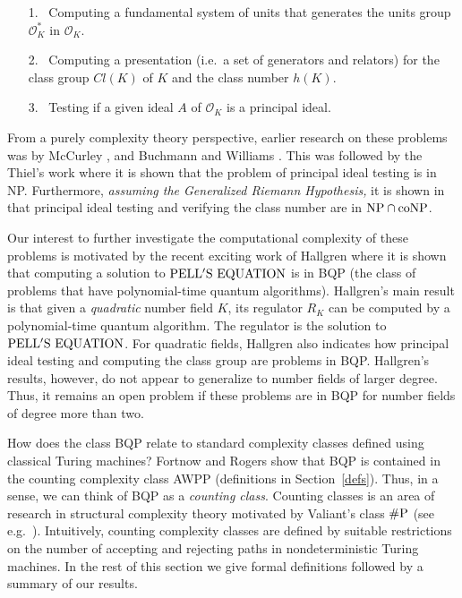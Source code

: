 \documentclass{article}
\newcommand{\pell}{\ensuremath{\rm PELL'S~EQUATION}}
\renewcommand{\O}{\mathcal{O}}
\newcommand{\numP}{{\rm \# P}}
\newcommand{\NP}{{\rm NP}}
\newcommand{\coNP}{\mbox{{\rm coNP}}}
\theoremstyle{definition}\newtheorem{remark}[theorem]{Remark}
\begin{document}
\begin{itemize}\label{prob}
\item[1.~] Computing a fundamental system of units that generates the units
group $\mathcal{O}_K^*$ in $\mathcal{O}_K$.
\item[2.~] Computing a presentation (i.e.\ a set of generators and
    relators) for the class group $Cl(K)$ of $K$ and the class number
    $h(K)$.
  \item[3.~] Testing if a given ideal $A$ of $\O_K$ is a principal
    ideal.
\end{itemize}

{From} a purely complexity theory perspective, earlier research on
these problems was by McCurley \cite{mccurley89class}, and Buchmann
and Williams \cite{buchmann89quadratic}. This was followed by the
Thiel's work \cite{thiel94class} where it is shown that the problem of
principal ideal testing is in NP. Furthermore, \emph{assuming the
  Generalized Riemann Hypothesis,} it is shown in \cite{thiel94class}
that principal ideal testing and verifying the class number are in
$\NP\cap\coNP$.

Our interest to further investigate the computational complexity of
these problems is motivated by the recent exciting work of Hallgren
\cite{hallgren:2002:polynomialtime} where it is shown that computing a
solution to $\pell$ is in BQP (the class of problems that have
polynomial-time quantum algorithms). Hallgren's main result is that
given a \emph{quadratic} number field $K$, its regulator $R_K$ can be
computed by a polynomial-time quantum algorithm. The regulator is the
solution to $\pell$. For quadratic fields, Hallgren also indicates how
principal ideal testing and computing the class group are problems in
BQP. Hallgren's results, however, do not appear to generalize to
number fields of larger degree. Thus, it remains an open problem if
these problems are in BQP for number fields of degree more than two.

How does the class BQP relate to standard complexity classes defined
using classical Turing machines? Fortnow and Rogers
\cite{fortnow98complexity} show that BQP is contained in the counting
complexity class AWPP (definitions in Section~\ref{defs}). Thus, in a
sense, we can think of BQP as a \emph{counting class}. Counting
classes is an area of research in structural complexity theory
motivated by Valiant's class $\numP$ (see e.g.\
\cite{fenner91gapdefinable}).  Intuitively, counting complexity
classes are defined by suitable restrictions on the number of
accepting and rejecting paths in nondeterministic Turing machines. In
the rest of this section we give formal definitions followed by a
summary of our results.
\end{document}
